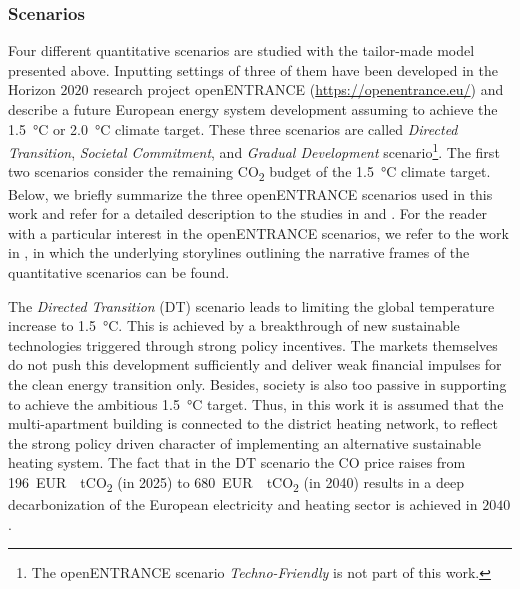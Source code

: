 \subsubsection{Scenarios}\label{sec:scenarios}
Four different quantitative scenarios are studied with the tailor-made model presented above. Inputting settings of three of them have been developed in the Horizon $2020$ research project openENTRANCE (\url{https://openentrance.eu/}) and describe a future European energy system development assuming to achieve the \SI{1.5}{\degreeCelsius} or \SI{2.0}{\degreeCelsius} climate target. These three scenarios are called \textit{Directed Transition}, \textit{Societal Commitment}, and \textit{Gradual Development} scenario\footnote{The openENTRANCE scenario \textit{Techno-Friendly} is not part of this work.}. The first two scenarios consider the remaining CO\textsubscript{2} budget of the \SI{1.5}{\degreeCelsius} climate target. Below, we briefly summarize the three openENTRANCE scenarios used in this work and refer for a detailed description to the studies in \cite{auer2020development} and \cite{auer2020quantitative}. For the reader with a particular interest in the openENTRANCE scenarios, we refer to the work in \cite{auer2019quantitative}, in which the underlying storylines outlining the narrative frames
of the quantitative scenarios can be found.\vspace{0.5cm}

The \textit{Directed Transition} (DT) scenario leads to limiting the global temperature increase to \SI{1.5}{\degreeCelsius}. This is achieved by a breakthrough of new sustainable technologies triggered through strong policy incentives. The markets themselves do not push this development sufficiently and deliver weak financial impulses for the clean energy transition only. Besides, society is also too passive in supporting to achieve the ambitious \SI{1.5}{\degreeCelsius} target. Thus, in this work it is assumed that the multi-apartment building is connected to the district heating network, to reflect the strong policy driven character of implementing an alternative sustainable heating system. The fact that in the DT scenario the CO price raises from \SI{196}{EUR \per tCO_{2}} (in 2025) to \SI{680}{EUR \per tCO_{2}} (in 2040) results in a deep decarbonization of the European electricity and heating sector is achieved in $2040$.\vspace{0.5cm}

